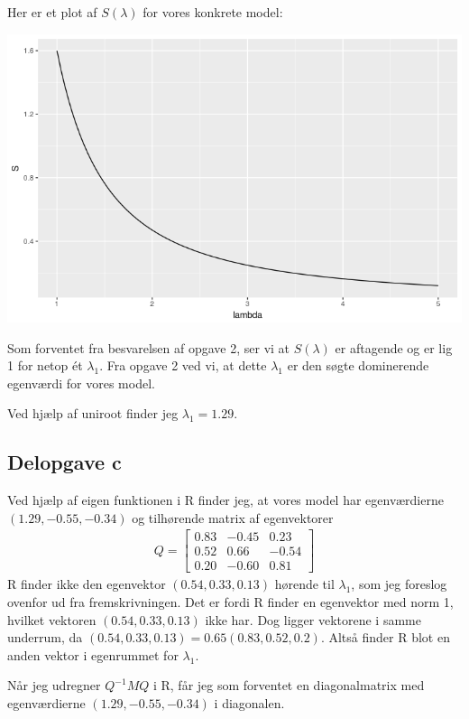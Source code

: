 \documentclass[12pt]{article}
\begin{document}
Her er et plot af $S(\lambda)$ for vores konkrete model:
\begin{center}
\includegraphics[scale=0.5]{q3p5.png}
\end{center}

Som forventet fra besvarelsen af opgave 2, ser vi at $S(\lambda)$ er aftagende og er lig 1 for netop ét $\lambda_1$. Fra opgave 2 ved vi, at dette $\lambda_1$ er den søgte dominerende egenværdi for vores model.

Ved hjælp af uniroot finder jeg $\lambda_1=1.29$.

\subsection{Delopgave c}

Ved hjælp af eigen funktionen i R finder jeg, at vores model har egenværdierne $(1.29, -0.55, -0.34)$ og tilhørende matrix af egenvektorer
\begin{align}
Q =
\begin{bmatrix}
0.83 & -0.45 & 0.23 \\ 
  0.52 & 0.66 & -0.54 \\ 
  0.20 & -0.60 & 0.81
\end{bmatrix}
\end{align}
R finder ikke den egenvektor $(0.54,0.33,0.13)$ hørende til $\lambda_1$, som jeg foreslog ovenfor ud fra fremskrivningen. Det er fordi R finder en egenvektor med norm 1, hvilket vektoren $(0.54,0.33,0.13)$ ikke har. Dog ligger vektorene i samme underrum, da $(0.54,0.33,0.13) = 0.65(0.83, 0.52, 0.2)$. Altså finder R blot en anden vektor i egenrummet for $\lambda_1$.

Når jeg udregner $Q^{-1}MQ$ i R, får jeg som forventet en diagonalmatrix med egenværdierne $(1.29, -0.55, -0.34)$ i diagonalen.
\end{document}
